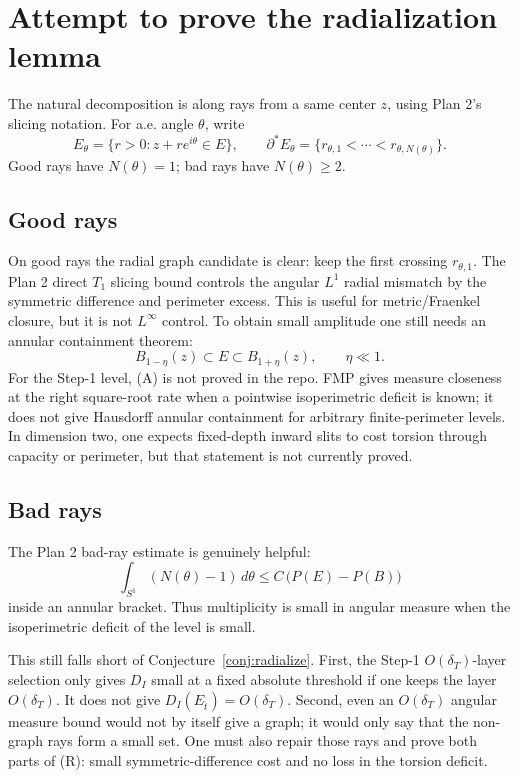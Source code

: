 \documentclass[11pt]{article}
\newcommand{\dT}{\delta_T}
\begin{document}
\section{Attempt to prove the radialization lemma}

The natural decomposition is along rays from a same center \(z\), using
Plan 2's slicing notation.  For a.e. angle \(\theta\), write
\[
   E_\theta=\{r>0:z+r e^{i\theta}\in E\},
   \qquad
   \partial^*E_\theta=\{r_{\theta,1}<\cdots<r_{\theta,N(\theta)}\}.
\]
Good rays have \(N(\theta)=1\); bad rays have \(N(\theta)\ge2\).

\subsection{Good rays}

On good rays the radial graph candidate is clear: keep the first
crossing \(r_{\theta,1}\).  The Plan 2 direct \(T_1\) slicing bound
controls the angular \(L^1\) radial mismatch by the symmetric difference
and perimeter excess.  This is useful for metric/Fraenkel closure, but
it is not \(L^\infty\) control.  To obtain small amplitude one still
needs an annular containment theorem:
\[
   B_{1-\eta}(z)\subset E \subset B_{1+\eta}(z),
   \qquad \eta\ll1.
   \tag{A}
\]
For the Step-1 level, (A) is not proved in the repo.  FMP gives
measure closeness at the right square-root rate when a pointwise
isoperimetric deficit is known; it does not give Hausdorff annular
containment for arbitrary finite-perimeter levels.  In dimension two,
one expects fixed-depth inward slits to cost torsion through capacity
or perimeter, but that statement is not currently proved.

\subsection{Bad rays}

The Plan 2 bad-ray estimate is genuinely helpful:
\[
   \int_{S^1} (N(\theta)-1)\,d\theta
      \le C\,\bigl(P(E)-P(B)\bigr)
\]
inside an annular bracket.  Thus multiplicity is small in angular
measure when the isoperimetric deficit of the level is small.

This still falls short of Conjecture~\ref{conj:radialize}.  First, the
Step-1 \(O(\dT)\)-layer selection only gives \(D_I\) small at a fixed
absolute threshold if one keeps the layer \(O(\dT)\).  It does not give
\(D_I(E_{\hat t})=O(\dT)\).  Second, even an \(O(\dT)\) angular measure
bound would not by itself give a graph; it would only say that the
non-graph rays form a small set.  One must also repair those rays and
prove both parts of (R): small symmetric-difference cost and no loss in
the torsion deficit.
\end{document}
